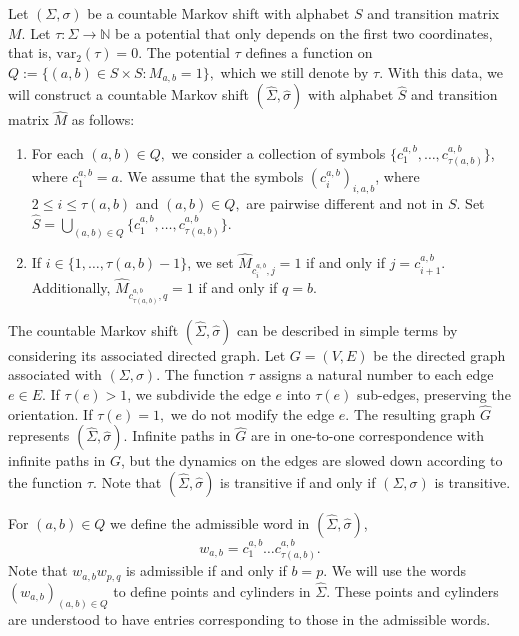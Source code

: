 \documentclass[letterpaper,11pt]{amsart}
\theoremstyle{plain}
\theoremstyle{plain}
\theoremstyle{definition}
\theoremstyle{remark}
\def\N{{\mathbb N}}
\begin{document}
Let $(\Sigma,\sigma)$ be a countable Markov shift with alphabet $S$ and transition matrix $M$. Let $\tau:\Sigma\to\N$ be a potential that only depends on the first two coordinates, that is, $\text{var}_2(\tau)=0$. The potential $\tau$ defines a function on $Q:=\{(a,b)\in S\times S:M_{a,b}=1\},$ which we still denote by $\tau$. With this data, we will construct a countable Markov shift $(\widehat{\Sigma},\widehat{\sigma})$ with alphabet  $\widehat{S}$ and transition matrix $\widehat{M}$ as follows:
\begin{enumerate}
\item For each $(a,b)\in Q,$ we consider a collection of symbols $\{c^{a,b}_1,\ldots,c^{a,b}_{\tau(a,b)}\}$, where $c^{a,b}_1=a$.  We assume that the symbols $(c^{a,b}_i)_{i,a,b}$, where $2\le i\le \tau(a,b)$ and $(a,b)\in Q,$  are pairwise different and not in $S$.  Set $\widehat{S}=\bigcup_{(a,b)\in Q} \{c^{a,b}_1,\ldots,c^{a,b}_{\tau(a,b)}\}$. 
\item If $i\in \{1,\ldots,\tau(a,b)-1\}$, we set $\widehat{M}_{c_i^{a,b}, j}=1$ if and only if $j=c_{i+1}^{a,b}$. Additionally, $\widehat{M}_{c^{a,b}_{\tau(a,b)},q}=1$ if and only if  $q=b$. 
\end{enumerate}

The countable Markov shift $(\widehat{\Sigma},\widehat{\sigma})$ can be described in simple terms by considering its associated directed graph. Let $G=(V,E)$ be the directed graph associated with $(\Sigma,\sigma)$. The function $\tau$ assigns a natural number to each edge $e\in E$. If $\tau(e)>1$, we subdivide the edge $e$ into $\tau(e)$ sub-edges, preserving the orientation.  If $\tau(e)=1,$ we do not modify the edge $e$. The resulting graph $\widehat{G}$ represents $(\widehat{\Sigma},\widehat{\sigma})$. Infinite paths in $\widehat{G}$ are in one-to-one correspondence with infinite paths in $G$, but the dynamics on the edges are slowed down according to the function $\tau$. Note that $(\widehat{\Sigma},\widehat{\sigma})$ is transitive if and only if $(\Sigma,\sigma)$ is transitive.

For $(a,b)\in Q$ we define the admissible word in $(\widehat{\Sigma},\widehat{\sigma})$, $$w_{a,b}=c^{a,b}_1\ldots c^{a,b}_{\tau(a,b)}.$$ Note that $w_{a,b}w_{p,q}$ is admissible if and only if $b=p$. We will use the words $(w_{a,b})_{(a,b)\in Q}$ to define points and cylinders in $\widehat{\Sigma}$. These points and cylinders are understood to have entries corresponding to those in the admissible words.
\end{document}
